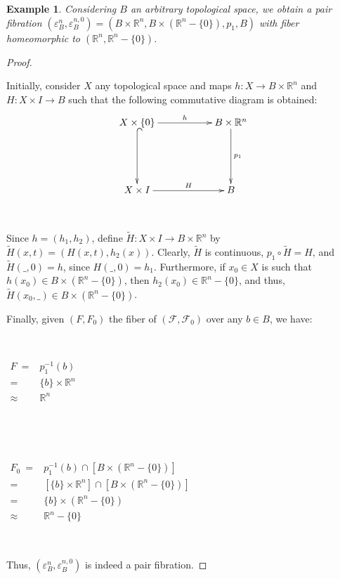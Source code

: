 \documentclass[12pt,oneside]{book}
\newtheorem{ex}     {Example}[chapter]
\newcommand{\R}{\mathbb{R}}
\newcommand{\wt}{\widetilde}
\begin{document}
    \begin{ex}\label{pf_trivial}
        Considering $B$ an arbitrary topological space, we obtain a pair fibration 
        $(\varepsilon_{B}^{n},\varepsilon_{B}^{n,0})=(B\times\R^{n},B\times(\R^{n}-\{ 0 \}),p_{1},B)$ with fiber homeomorphic to 
        $(\R^{n},\R^{n}-\{ 0 \})$.
    \end{ex}
    \begin{proof}

        \
    
        Initially, consider $X$ any topological space and maps $h:X\to B\times\R^{n}$ and $H:X\times I\to B$ such that the following 
        commutative diagram is obtained:
        $$\xymatrix @C=0.5cm {
            X\times\{ 0 \} \ar[rrr]^-{h} \ar@{^(->}[dd] &&& B\times\R^{n} \ar[dd]^-{p_{1}} \\
            &&& \\
            X\times I \ar[rrr]^-{H} &&& B
        }$$

        \
        
        Since $h=(h_{1},h_{2})$, define $\wt{H}:X\times I\to B\times\R^{n}$ by $\wt{H}(x,t)=(H(x,t),h_{2}(x))$. Clearly, $\wt{H}$ is 
        continuous, $p_{1}\circ\wt{H}=H$, and $\wt{H}(\_,0)=h$, since $H(\_,0)=h_{1}$. Furthermore, if $x_{0}\in X$ is such that 
        $h(x_{0})\in B\times (\R^{n}-\{ 0 \})$, then $h_{2}(x_{0})\in \R^{n}-\{ 0 \}$, and thus, 
        $\wt{H}(x_{0},\_)\in B\times(\R^{n}-\{ 0 \})$.
        
        Finally, given $(F,F_{0})$ the fiber of $(\mathcal{F},\mathcal{F}_{0})$ over any $b\in B$, we have:

        \
        
        $\begin{array}{rl}
            F \ = & p_{1}^{-1}(b) \\
            = & \{ b \}\times\R^{n} \\
            \approx & \R^{n}
        \end{array}$
        
        \
        
        \
        
        $\begin{array}{rl}
            F_{0} \ = & p_{1}^{-1}(b)\cap [B\times(\R^{n}-\{ 0 \})] \\
            = & [\{ b \}\times\R^{n}]\cap [B\times(\R^{n}-\{ 0 \})] \\
            = & \{ b \}\times(\R^{n}-\{ 0 \}) \\
            \approx & \R^{n}-\{ 0 \}
        \end{array}$ 

        \
        
        Thus, $(\varepsilon_{B}^{n},\varepsilon_{B}^{n,0})$ is indeed a pair fibration.
    
    \end{proof}
    
\end{document}
